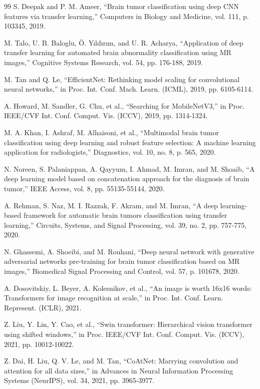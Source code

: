 \documentclass[final,3p,times,number]{elsarticle}
\begin{document}
\begin{thebibliography}{99}
 S. Deepak and P. M. Ameer, ``Brain tumor classification using deep CNN features via transfer learning,'' Computers in Biology and Medicine, vol. 111, p. 103345, 2019.

 M. Talo, U. B. Baloglu, \"O. Y{\i}ld{\i}r{\i}m, and U. R. Acharya, ``Application of deep transfer learning for automated brain abnormality classification using MR images,'' Cognitive Systems Research, vol. 54, pp. 176-188, 2019.

 M. Tan and Q. Le, ``EfficientNet: Rethinking model scaling for convolutional neural networks,'' in Proc. Int. Conf. Mach. Learn. (ICML), 2019, pp. 6105-6114.

 A. Howard, M. Sandler, G. Chu, et al., ``Searching for MobileNetV3,'' in Proc. IEEE/CVF Int. Conf. Comput. Vis. (ICCV), 2019, pp. 1314-1324.

 M. A. Khan, I. Ashraf, M. Alhaisoni, et al., ``Multimodal brain tumor classification using deep learning and robust feature selection: A machine learning application for radiologists,'' Diagnostics, vol. 10, no. 8, p. 565, 2020.

 N. Noreen, S. Palaniappan, A. Qayyum, I. Ahmad, M. Imran, and M. Shoaib, ``A deep learning model based on concatenation approach for the diagnosis of brain tumor,'' IEEE Access, vol. 8, pp. 55135-55144, 2020.

 A. Rehman, S. Naz, M. I. Razzak, F. Akram, and M. Imran, ``A deep learning-based framework for automatic brain tumors classification using transfer learning,'' Circuits, Systems, and Signal Processing, vol. 39, no. 2, pp. 757-775, 2020.

 N. Ghassemi, A. Shoeibi, and M. Rouhani, ``Deep neural network with generative adversarial networks pre-training for brain tumor classification based on MR images,'' Biomedical Signal Processing and Control, vol. 57, p. 101678, 2020.

 A. Dosovitskiy, L. Beyer, A. Kolesnikov, et al., ``An image is worth 16x16 words: Transformers for image recognition at scale,'' in Proc. Int. Conf. Learn. Represent. (ICLR), 2021.

 Z. Liu, Y. Lin, Y. Cao, et al., ``Swin transformer: Hierarchical vision transformer using shifted windows,'' in Proc. IEEE/CVF Int. Conf. Comput. Vis. (ICCV), 2021, pp. 10012-10022.

 Z. Dai, H. Liu, Q. V. Le, and M. Tan, ``CoAtNet: Marrying convolution and attention for all data sizes,'' in Advances in Neural Information Processing Systems (NeurIPS), vol. 34, 2021, pp. 3965-3977.


\end{thebibliography}
\end{document}
